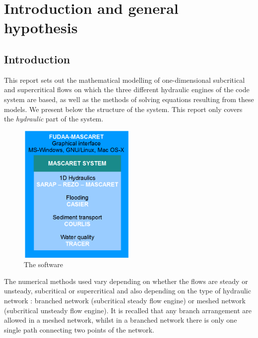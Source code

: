 \chapter{Introduction and general hypothesis}
\label{Chapter1}

\section{Introduction}

This report sets out the mathematical modelling of one-dimensional subcritical
and supercritical flows on which the three different hydraulic engines of the
code system \mascaret{} are based, as well as the methods of solving
equations resulting from these models.
We present below the structure of the \mascaret{} system. This report
only covers the \textit{hydraulic} part of the system.

\begin{figure}[h]
 \begin{center}
  \includegraphics[width=0.5\textwidth]{Figures/MASCARET_system.png}
  \caption{The \mascaret{} software}
 \end{center}
\end{figure}

The numerical methods used vary depending on whether the flows are steady or
unsteady, subcritical or supercritical and also depending on the type of
hydraulic network : branched network (subcritical steady flow engine) or meshed
network (subcritical unsteady flow engine). It is recalled that any branch
arrangement are allowed in a meshed network, whilst in a branched network there
is only one single path connecting two points of the network.

